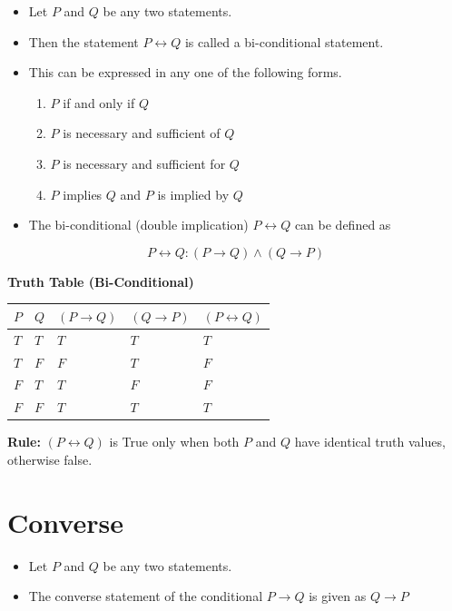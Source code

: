 \documentclass[]{book}
\providecommand{\tightlist}{%
  \setlength{\itemsep}{0pt}\setlength{\parskip}{0pt}}
\begin{document}
\begin{itemize}
\tightlist
\item
  Let \(P\) and \(Q\) be any two statements.
\item
  Then the statement \(P \leftrightarrow Q\) is called a bi-conditional statement.
\item
  This can be expressed in any one of the following forms.

  \begin{enumerate}
  \def\labelenumi{\alph{enumi})}
  \tightlist
  \item
    \(P\) if and only if \(Q\)
  \item
    \(P\) is necessary and sufficient of \(Q\)
  \item
    \(P\) is necessary and sufficient for \(Q\)
  \item
    \(P\) implies \(Q\) and \(P\) is implied by \(Q\)
  \end{enumerate}
\item
  The bi-conditional (double implication) \(P \leftrightarrow Q\) can be defined as
\end{itemize}

\[P \leftrightarrow Q: (P \rightarrow Q) \land (Q \rightarrow P)\]

\newpage

\textbf{Truth Table (Bi-Conditional)}

\begin{longtable}[]{@{}lllll@{}}
\toprule
\(P\) & \(Q\) & \((P \rightarrow Q)\) & \((Q \rightarrow P)\) & \((P \leftrightarrow Q)\)\tabularnewline
\midrule
\endhead
\(T\) & \(T\) & \(T\) & \(T\) & \(T\)\tabularnewline
\(T\) & \(F\) & \(F\) & \(T\) & \(F\)\tabularnewline
\(F\) & \(T\) & \(T\) & \(F\) & \(F\)\tabularnewline
\(F\) & \(F\) & \(T\) & \(T\) & \(T\)\tabularnewline
\bottomrule
\end{longtable}

\textbf{Rule:} \((P \leftrightarrow Q)\) is True only when both \(P\) and \(Q\) have identical truth values, otherwise false.

\hypertarget{converse}{%
\section{Converse}\label{converse}}

\begin{itemize}
\tightlist
\item
  Let \(P\) and \(Q\) be any two statements.
\item
  The converse statement of the conditional \(P \rightarrow Q\) is given as \(Q \rightarrow P\)
\end{itemize}
\end{document}
